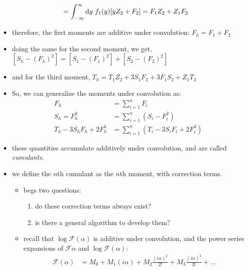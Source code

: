 \documentclass[../jaynes_prob_theory_notes.tex]{subfiles}
\begin{document}
\begin{itemize}
\begin{align*}
                            &= \int^{\infty}_{-\infty} \mathrm{d}y~f_{1}(y)[yZ_2 + F_2] = F_{1}Z_{2} + Z_{1}F_{2}
                    \end{align*}
                \item therefore, the first moments are additive under convolution: $F_h = F_1 + F_2$
                \item doing the same for the second moment, we get, $[S_h - {(F_h)}^2] = [S_1 - {(F_1)}^2] + [S_2 - {(F_2)}^2]$
                \item and for the third moment, $T_h = T_{1}Z_{2} + 3S_{1}F_{2} + 3F_{1}S_{2} + Z_{1}T_{2}$
                \item So, we can generalize the moments under convolution as:
                    \begin{align*}
                        F_h &= \sum^{n}_{i=1} F_i \\
                        S_h = F^{2}_h &= \sum^{n}_{i=1} \left( S_i - F^{2}_i \right) \\
                        T_h - 3S_{h}F_{h} + 2F^{3}_{h} &= \sum^{n}_{i=1} \left( T_i - 3S_{i}F_{i} + 2F^{3}_i \right)
                    \end{align*}
                \item these quantities accumulate additively under convolution, and are called \textit{cumulants}.
                \item we define the $n$th cumulant as the $n$th moment, with correction terms.
                    \begin{itemize}
                        \item begs two questions:
                            \begin{enumerate}
                                \item do these correction terms always exist?
                                \item is there a general algorithm to develop them?
                            \end{enumerate}
                        \item recall that $\log \mathscr{F}(\alpha)$ is additive under convolution, and the power series expansions of $\mathscr{F}{\alpha}$ and $\log \mathscr{F}(\alpha)$:
                            \begin{align*}
                                \mathscr{F}(\alpha) &= M_0 + M_{1}(i\alpha) + M_{2}\frac{{(i\alpha)}^2}{2!} + M_{3}\frac{{(i\alpha)}^3}{3!} + \ldots \\

\end{align*}
\end{itemize}
\end{itemize}
\end{document}
